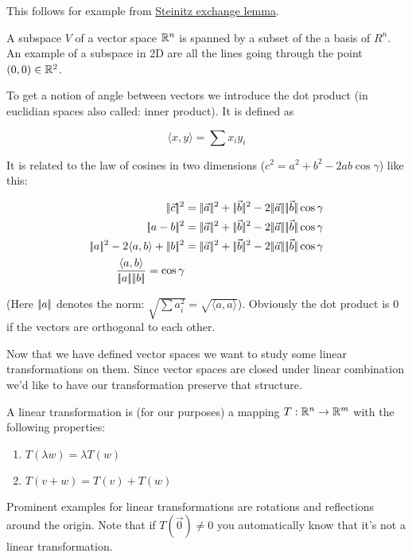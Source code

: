 This follows for example from \href{http://en.wikipedia.org/wiki/Steinitz_exchange_lemma}{Steinitz exchange lemma}.

\begin{Def}[Subspace]
 A subspace $V$ of a vector space $\mathbb{R}^n$ is spanned by a subset of the a basis of $R^n$. An example of a subspace in 2D are all the lines going through the point $(0,0) \in \mathbb{R}^2$.
\end{Def}

To get a notion of angle between vectors we introduce the dot product (in euclidian spaces also called: inner product). It is defined as

\[\langle x,y\rangle  = \sum x_iy_i\]

It is related to the law of cosines in two dimensions ($c^2 = a^2+b^2-2ab\cos \gamma$) like this:

\begin{align*}
\norm{\vec c}^2 &= \norm{\vec a}^2 + \norm{\vec b}^2 -2\norm{\vec a}\norm{\vec b}\cos \gamma\\
\norm{a-b}^2 &= \norm{\vec a}^2 + \norm{\vec b}^2 -2\norm{\vec a}\norm{\vec b}\cos \gamma\\
\norm{a}^2-2\langle a,b\rangle +\norm{b}^2 &= \norm{\vec a}^2 + \norm{\vec b}^2 -2\norm{\vec a}\norm{\vec b}\cos \gamma\\
\frac{\langle a,b\rangle }{\norm{a}\norm{b}} = \cos \gamma
\end{align*}

(Here $|\!|a|\!|$ denotes the norm: $\sqrt{\sum a_i^2} = \sqrt{\langle a,a\rangle }$). Obviously the dot product is 0 if the vectors are orthogonal to each other.

Now that we have defined vector spaces we want to study some linear transformations on them. Since vector spaces are closed under linear combination we'd like to have our transformation preserve that structure.

\begin{Def} A linear transformation is (for our purposes) a mapping $T : \mathbb{R}^n \rightarrow \mathbb{R}^m$ with the following properties:

\begin{enumerate}
\item $T(\lambda w) = \lambda T(w)$
\item $T(v+w) = T(v)+T(w)$
\end{enumerate}
\end{Def}

Prominent examples for linear transformations are rotations and reflections around the origin. Note that if $T(\vec 0)\neq 0$ you automatically know that it's not a linear transformation.

